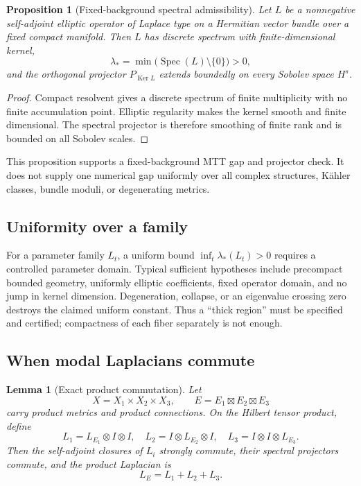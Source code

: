 \documentclass[11pt]{article}
\newtheorem{proposition}[theorem]{Proposition}
\newtheorem{lemma}[theorem]{Lemma}
\theoremstyle{definition}
\theoremstyle{remark}
\newcommand{\Spec}{\operatorname{Spec}}
\newcommand{\Ker}{\operatorname{Ker}}
\begin{document}
\begin{proposition}[Fixed-background spectral admissibility]
\label{prop:fixed-spectrum}
Let \(L\) be a nonnegative self-adjoint elliptic operator of Laplace type on a
Hermitian vector bundle over a fixed compact manifold.  Then \(L\) has
discrete spectrum with finite-dimensional kernel,
\[
\lambda_\ast
=\min\bigl(\Spec(L)\setminus\{0\}\bigr)>0,
\]
and the orthogonal projector \(P_{\Ker L}\) extends boundedly on every Sobolev
space \(H^s\).
\end{proposition}

\begin{proof}
Compact resolvent gives a discrete spectrum of finite multiplicity with no
finite accumulation point.  Elliptic regularity makes the kernel smooth and
finite dimensional.  The spectral projector is therefore smoothing of
finite rank and is bounded on all Sobolev scales.
\end{proof}

This proposition supports a fixed-background MTT gap and projector check.
It does not supply one numerical gap uniformly over all complex structures,
K\"ahler classes, bundle moduli, or degenerating metrics.

\subsection{Uniformity over a family}

For a parameter family \(L_t\), a uniform bound
\(\inf_t\lambda_\ast(L_t)>0\) requires a controlled parameter domain.  Typical
sufficient hypotheses include precompact bounded geometry, uniformly
elliptic coefficients, fixed operator domain, and no jump in kernel
dimension.  Degeneration, collapse, or an eigenvalue crossing zero destroys
the claimed uniform constant.  Thus a ``thick region'' must be specified and
certified; compactness of each fiber separately is not enough.

\subsection{When modal Laplacians commute}

\begin{lemma}[Exact product commutation]
\label{lem:product-commutation}
Let
\[
X=X_1\times X_2\times X_3,\qquad
E=E_1\boxtimes E_2\boxtimes E_3
\]
carry product metrics and product connections.  On the Hilbert tensor
product, define
\[
L_1=L_{E_1}\otimes I\otimes I,\quad
L_2=I\otimes L_{E_2}\otimes I,\quad
L_3=I\otimes I\otimes L_{E_3}.
\]
Then the self-adjoint closures of \(L_i\) strongly commute, their spectral
projectors commute, and the product Laplacian is
\[
L_E=L_1+L_2+L_3.
\]
\end{lemma}
\end{document}
